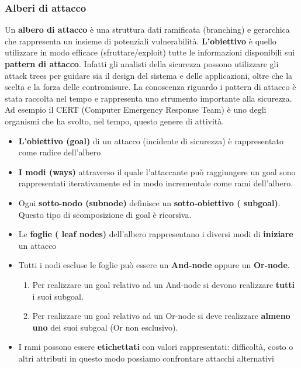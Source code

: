 \documentclass[12pt]{article}
\begin{document}
			\subsubsection{Alberi di attacco}
				Un \textbf{albero di attacco} è una struttura dati ramificata (branching) e gerarchica che rappresenta un insieme di potenziali vulnerabilità. \textbf{L'obiettivo} è quello utilizzare in modo efficace (sfruttare/exploit) tutte le informazioni disponibili sui \textbf{pattern di attacco}. Infatti gli analisti della sicurezza possono utilizzare gli attack trees per guidare sia il design del sistema e delle applicazioni, oltre che la scelta e la forza delle contromisure. La conoscenza riguardo i pattern di attacco è stata raccolta nel tempo e rappresenta uno strumento importante alla sicurezza. Ad esempio il CERT (Computer Emergency Response Team) è uno degli organismi che ha svolto, nel tempo, questo genere di attività.
				
				\begin{itemize}
					\item \textbf{L'obiettivo (goal)} di un attacco (incidente di sicurezza) è rappresentato come radice dell'albero 
					\item \textbf{I modi (ways)} attraverso il quale l'attaccante può raggiungere un goal sono rappresentati iterativamente ed in modo incrementale come rami dell'albero.
					\item Ogni \textbf{sotto-nodo (subnode)} definisce un \textbf{sotto-obiettivo ( subgoal)}. Questo tipo di scomposizione di goal è ricorsiva.
					\item Le \textbf{foglie ( leaf nodes)} dell'albero rappresentano i diversi modi di \textbf{iniziare} un attacco
					\item Tutti i nodi escluse le foglie può essere un \textbf{And-node} oppure un \textbf{Or-node}.
					\begin{enumerate}
						\item Per realizzare un goal relativo ad un And-node si devono realizzare \textbf{tutti} i suoi subgoal.
						\item Per realizzare un goal relativo ad un Or-node si deve realizzare \textbf{almeno uno} dei suoi subgoal (Or non esclusivo).
					\end{enumerate} 
					\item I rami possono essere \textbf{etichettati }con valori rappresentati: difficoltà, costo o altri attributi in questo modo possiamo confrontare attacchi alternativi
				\end{itemize}
\end{document}
